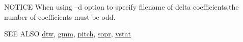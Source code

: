 \begin{qsection}{NOTICE}
When using --d option to specify filename of delta coefficients,the
number of coefficients must be odd.
\end{qsection}

\begin{qsection}{SEE ALSO}
\hyperlink{dtw}{dtw},
\hyperlink{gmm}{gmm},
\hyperlink{pitch}{pitch},
\hyperlink{sopr}{sopr},
\hyperlink{vstat}{vstat}
\end{qsection}
